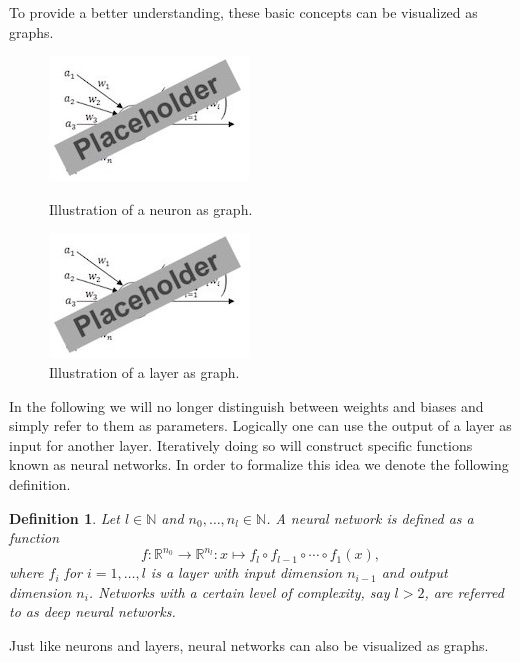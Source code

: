 \documentclass[11pt, a4paper]{article}
\newtheorem{definition}[theorem]{Definition}
\newcommand{\N}{\mathbb{N}}
\newcommand{\R}{\mathbb{R}}
\begin{document}
To provide a better understanding, these basic concepts can be visualized as graphs. \\

\begin{figure}[!h]
	\begin{minipage}[c]{0.5\linewidth}
	\centering
	\includegraphics{images/neuron.png}
      		\caption{Illustration of a neuron as graph.}
	\end{minipage}
	\hfill
	\begin{minipage}[c]{0.5\linewidth}
	\centering
	\includegraphics{images/neuron.png}
      		\caption{Illustration of a layer as graph.}
	\end{minipage}
\end{figure}

In the following we will no longer distinguish between weights and biases and simply refer to them as parameters. Logically one can use the output of a layer as input for another layer. Iteratively doing so will construct specific functions known as neural networks. In order to formalize this idea we denote the following definition. \\

\pagebreak
\begin{definition} \label{def:network}
Let $l \in \N$ and $n_0, \dots, n_l \in \N$. A neural network is defined as a function
\[ f : \R^{n_0} \to \R^{n_l} : x \mapsto f_l \circ f_{l-1} \circ \cdots \circ f_1 (x),\]
where $f_i$ for $i=1, \dots, l$ is a layer with input dimension $n_{i-1}$ and output dimension $n_i$. Networks with a certain level of complexity, say $l>2$, are referred to as deep neural networks.
\end{definition}

Just like neurons and layers, neural networks can also be visualized as graphs.
\end{document}
